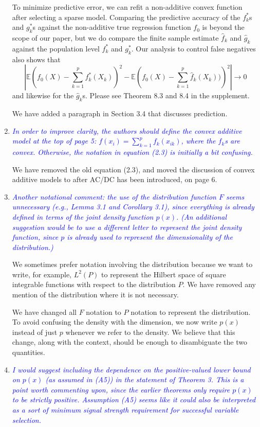 \documentclass[pdftex,12pt]{article}
\let\hat\widehat
\def\rc#1{{\it\textcolor{blue}{#1}}\smallskip}
\begin{document}
\begin{enumerate}[(1)]
To minimize predictive error, we can refit a non-additive convex
function after selecting a sparse model. Comparing the predictive
accuracy of the $f^*_k$s and $g^*_k$s against the non-additive true
regression function $f_0$ is beyond the scope of our paper, but we do
compare the finite sample estimate $\hat{f}_k$ and $\hat{g}_k$ against
the population level $f^*_k$ and $g^*_k$. Our analysis to
control false negatives also shows that $$\left| \mathbb{E}\left(
f_0(X) - \sum_{k=1}^p f^*_k(X_k) \right)^2 - \mathbb{E} \left( f_0(X)
- \sum_{k=1}^p \hat{f}_k(X_k))\right)^2 \right| \rightarrow 0$$ and
likewise for the $\hat{g}_k$s. Please see Theorem 8.3 and 8.4 in the
supplement.

We have added a paragraph in Section 3.4 that discusses prediction. 

\item \rc{In order to improve clarity, the authors should define the convex
additive model at the top of page 5: $f(x_i) = \sum_{k=1}^p f_k(x_{ik})$, where the
$f_k$s are convex.  Otherwise, the notation in equation (2.3) is
initially a bit confusing.}

We have removed the old equation (2.3), and moved the discussion of convex
additive models to after AC/DC has been introduced, on page 6.

\item \rc{Another notational comment: the use of the
distribution function $F$ seems unnecessary (e.g., Lemma 3.1 and
Corollary 3.1), since everything is already defined in terms of the
joint density function $p(x)$. (An additional suggestion would be to use
a different letter to represent the joint density function, since $p$ is
already used to represent the dimensionality of the distribution.)}

We sometimes prefer notation involving the distribution because we want to
write, for example, $L^2(P)$ to represent the Hilbert space
of square integrable functions with respect to the
distribution $P$. We have removed any mention of the distribution
where it is not necessary.

We have changed all $F$ notation to $P$ notation to represent the
distribution. To avoid confusing the density with the
dimension, we now write $p(x)$ instead of just $p$ whenever we
refer to the density. We believe that this change, along with the
context, should be enough to disambiguate the two quantities.

\item \rc{I would suggest including the dependence on the positive-valued lower
bound on $p(x)$ (as assumed in (A5)) in the statement of Theorem 3. This
is a point worth commenting upon, since the earlier theorems only
require $p(x)$ to be strictly positive. Assumption (A5) seems like it
could also be interpreted as a sort of minimum signal strength
requirement for successful variable selection.}


\end{enumerate}
\end{document}
